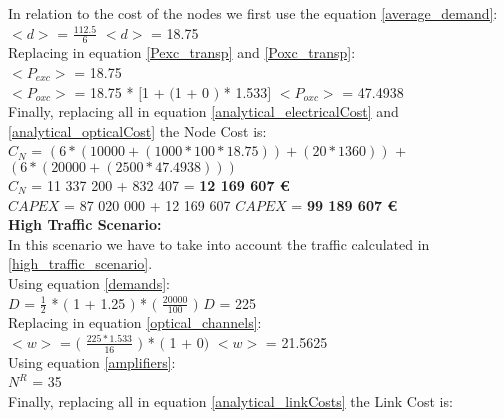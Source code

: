 In relation to the cost of the nodes we first use the equation \ref{average_demand}:\\

$<d>$ = $\frac{112.5}{6}$ \qquad \qquad $<d>$ = 18.75\\

Replacing in equation \ref{Pexc_transp} and \ref{Poxc_transp}:\\

$<P_{exc}>$ = 18.75\\

$<P_{oxc}>$ = 18.75 * $[$1 + $($1 + $0$ $)$ * 1.533$]$ \qquad \quad $<P_{oxc}>$ = 47.4938 \\

Finally, replacing all in equation \ref{analytical_electricalCost} and \ref{analytical_opticalCost} the Node Cost is:\\

$C_N$ = $\left(6 * (10 000 + (1 000 * 100 * 18.75)) + (20 * 1 360)\right)$ + $\left(6 * (20 000 + (2 500 * 47.4938)) \right)$\\

$C_N$ = 11 337 200 + 832 407 = \textbf{12 169 607 \euro}\\

$CAPEX$ = 87 020 000 + 12 169 607 \qquad \qquad $CAPEX$ = \textbf{99 189 607 \euro}\\

\textbf{High Traffic Scenario:}\\

In this scenario we have to take into account the traffic calculated in \ref{high_traffic_scenario}.\\

Using equation \ref{demands}:\\

$D$ = $\frac{1}{2}$ * $($ 1 + 1.25 $)$ * $($ $\frac{20000}{100}$ $)$ \qquad \qquad $D$ = 225\\

Replacing in equation \ref{optical_channels}:\\

$<w>$ = $($ $\frac{225 * 1.533}{16}$ $)$ * $($ 1 + 0$)$ \qquad \qquad $<w>$ = 21.5625\\

Using equation \ref{amplifiers}:\\

$N^R$ = 35\\

Finally, replacing all in equation \ref{analytical_linkCosts} the Link Cost is:\\

